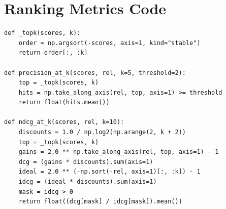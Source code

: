 \documentclass[12pt,a4paper]{article}
\numberwithin{equation}{section}
\theoremstyle{definition}
\theoremstyle{plain}
\begin{document}
\section{Ranking Metrics Code}\label{app:metrics}
\begin{lstlisting}[caption={Precision@$k$ and nDCG@$k$ (excerpt of \texttt{giglink\_ai/metrics.py}).}]
def _topk(scores, k):
    order = np.argsort(-scores, axis=1, kind="stable")
    return order[:, :k]

def precision_at_k(scores, rel, k=5, threshold=2):
    top = _topk(scores, k)
    hits = np.take_along_axis(rel, top, axis=1) >= threshold
    return float(hits.mean())

def ndcg_at_k(scores, rel, k=10):
    discounts = 1.0 / np.log2(np.arange(2, k + 2))
    top = _topk(scores, k)
    gains = 2.0 ** np.take_along_axis(rel, top, axis=1) - 1
    dcg = (gains * discounts).sum(axis=1)
    ideal = 2.0 ** (-np.sort(-rel, axis=1)[:, :k]) - 1
    idcg = (ideal * discounts).sum(axis=1)
    mask = idcg > 0
    return float((dcg[mask] / idcg[mask]).mean())
\end{lstlisting}
\end{document}
